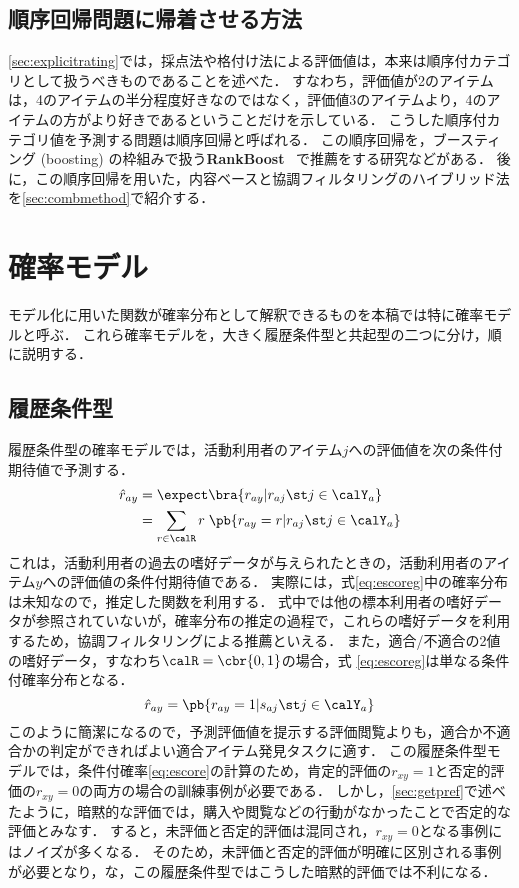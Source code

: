 \subsection{順序回帰問題に帰着させる方法}

\ref{sec:explicitrating}では，採点法や格付け法による評価値は，本来は順序付カテゴリとして扱うべきものであることを述べた．
すなわち，評価値が2のアイテムは，4のアイテムの半分程度好きなのではなく，評価値3のアイテムより，4のアイテムの方がより好きであるということだけを示している．
こうした順序付カテゴリ値を予測する問題は順序回帰と呼ばれる．
この順序回帰を，ブースティング (boosting) \cite{icml:96:02,jjsai:99:01} の枠組みで扱う\textbf{RankBoost}~\cite{icml:98:03,jmlr:03:02} で推薦をする研究などがある．
後に，この順序回帰を用いた，内容ベースと協調フィルタリングのハイブリッド法を\ref{sec:combmethod}で紹介する．

\section{確率モデル}
\label{sec:probmodel}

モデル化に用いた関数が確率分布として解釈できるものを本稿では特に確率モデルと呼ぶ．
これら確率モデルを，大きく履歴条件型と共起型の二つに分け，順に説明する．

\subsection{履歴条件型}

履歴条件型の確率モデルでは，活動利用者のアイテム$j$への評価値を次の条件付期待値で予測する\cite{uai:98:01}．
\begin{align}
\hat{r}_{ay} & = \expect\bra{r_{ay}|r_{aj}\st j\in\calY_a}\nonumber\\
& = \sum_{r\in\calR} r\;\pb{r_{ay}=r|r_{aj}\st j\in\calY_a}
\label{eq:escoreg}
\end{align}
これは，活動利用者の過去の嗜好データが与えられたときの，活動利用者のアイテム$y$への評価値の条件付期待値である．
実際には，式\eqref{eq:escoreg}中の確率分布は未知なので，推定した関数を利用する．
式中では他の標本利用者の嗜好データが参照されていないが，確率分布の推定の過程で，これらの嗜好データを利用するため，協調フィルタリングによる推薦といえる．
また，適合/不適合の2値の嗜好データ，すなわち$\calR=\cbr{0,1}$の場合，式
\eqref{eq:escoreg}は単なる条件付確率分布となる．
\begin{equation}
\hat{r}_{ay}=\pb{r_{ay}=1|s_{aj}\st j\in \calY_a}
\label{eq:escore}
\end{equation}
このように簡潔になるので，予測評価値を提示する評価閲覧よりも，適合か不適合かの判定ができればよい適合アイテム発見タスクに適す．
この履歴条件型モデルでは，条件付確率\eqref{eq:escore}の計算のため，肯定的評価の$r_{xy}=1$と否定的評価の$r_{xy}=0$の両方の場合の訓練事例が必要である．
しかし，\ref{sec:getpref}で述べたように，暗黙的な評価では，購入や閲覧などの行動がなかったことで否定的な評価とみなす．
すると，未評価と否定的評価は混同され，$r_{xy}=0$となる事例にはノイズが多くなる．
そのため，未評価と否定的評価が明確に区別される事例が必要となり，な，この履歴条件型ではこうした暗黙的評価では不利になる．


